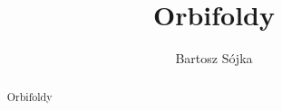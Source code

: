 \documentclass[a4paper, 12pt]{report}
\title{Orbifoldy}
\author{Bartosz Sójka}
\begin{document}

\tableofcontents
\begin{abstract}
\setcounter{page}{4}
Orbifoldy
\end{abstract}







%

%

\end{document}
